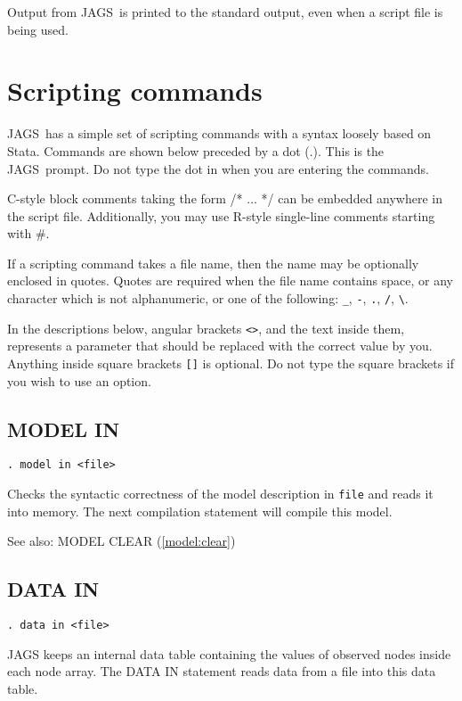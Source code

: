 \documentclass[11pt, a4paper, titlepage]{report}
\newcommand{\JAGS}{\textsf{JAGS}}
\newcommand{\R}{\textsf{R}}
\begin{document}
Output from \JAGS\ is printed to the standard output, even when a
script file is being used.  

\section{Scripting commands}
\label{section:scripting}

\JAGS\ has a simple set of scripting commands with a syntax loosely
based on \textsf{Stata}. Commands are shown below preceded by a dot
(.). This is the \JAGS\ prompt. Do not type the dot in when you are
entering the commands.

C-style block comments taking the form /* ... */ can be
embedded anywhere in the script file.  Additionally, you may use
\R-style single-line comments starting with \#.

If a scripting command takes a file name, then the name may be
optionally enclosed in quotes. Quotes are required when the file name
contains space, or any character which is not alphanumeric, or one of
the following: \verb+_+, \verb+-+, \verb+.+, \verb+/+, \verb+\+.

In the descriptions below, angular brackets \verb+<>+, and the text
inside them, represents a parameter that should be replaced with the
correct value by you.  Anything inside square brackets \verb+[]+ is
optional. Do not type the square brackets if you wish to use an
option.

\subsection{MODEL IN}

\begin{verbatim}
. model in <file>
\end{verbatim}
Checks the syntactic correctness of the model description in
\texttt{file} and reads it into memory. The next compilation
statement will compile this model. 

See also: MODEL CLEAR (\ref{model:clear})

\subsection{DATA IN}
\label{data:in}

\begin{verbatim}
. data in <file>
\end{verbatim}
JAGS keeps an internal data table containing the values of observed
nodes inside each node array.  The DATA IN statement reads data from a
file into this data table.
\end{document}
